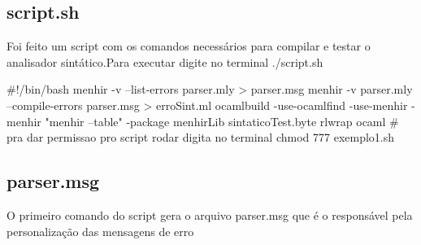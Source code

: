 \documentclass[12pt,a4paper,twoside]{report}
\begin{document}
\subsection{script.sh}
Foi feito um script com os comandos necessários para compilar e testar o analisador sintático.Para executar digite no terminal ./script.sh
\begin{terminal}
#!/bin/bash
menhir -v --list-errors parser.mly > parser.msg
menhir -v parser.mly --compile-errors parser.msg > erroSint.ml
ocamlbuild -use-ocamlfind -use-menhir -menhir "menhir --table" -package menhirLib sintaticoTest.byte
rlwrap ocaml
# pra dar permissao pro script rodar digita no terminal chmod 777 exemplo1.sh
\end{terminal}
\subsection{parser.msg}
O primeiro comando do script gera o arquivo parser.msg que é o responsável pela personalização das mensagens de erro
\end{document}

